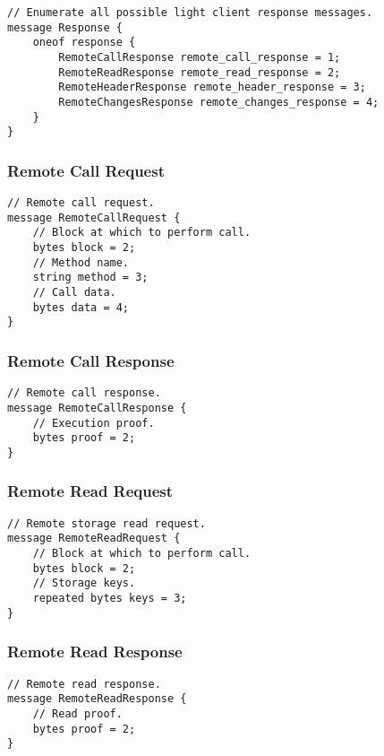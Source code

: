 \documentclass{book}
\begin{document}
\begin{lstlisting}[frame=single]
// Enumerate all possible light client response messages.
message Response {
	oneof response {
		RemoteCallResponse remote_call_response = 1;
		RemoteReadResponse remote_read_response = 2;
		RemoteHeaderResponse remote_header_response = 3;
		RemoteChangesResponse remote_changes_response = 4;
	}
}
\end{lstlisting}

\subsubsection{Remote Call Request}

\begin{lstlisting}[frame=single]
// Remote call request.
message RemoteCallRequest {
	// Block at which to perform call.
	bytes block = 2;
	// Method name.
	string method = 3;
	// Call data.
	bytes data = 4;
}
\end{lstlisting}

\subsubsection{Remote Call Response}

\begin{lstlisting}[frame=single]
// Remote call response.
message RemoteCallResponse {
	// Execution proof.
	bytes proof = 2;
}
\end{lstlisting}

\subsubsection{Remote Read Request}

\begin{lstlisting}[frame=single]
// Remote storage read request.
message RemoteReadRequest {
	// Block at which to perform call.
	bytes block = 2;
	// Storage keys.
	repeated bytes keys = 3;
}
\end{lstlisting}

\subsubsection{Remote Read Response}

\begin{lstlisting}[frame=single]
// Remote read response.
message RemoteReadResponse {
	// Read proof.
	bytes proof = 2;
}
\end{lstlisting}
\end{document}
